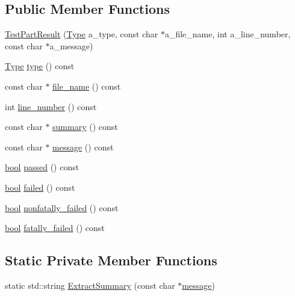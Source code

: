 \subsection*{Public Member Functions}
\begin{DoxyCompactItemize}
\item 
\hyperlink{classtesting_1_1TestPartResult_a6409eb519c1cd514aab2426c8f40737f}{Test\+Part\+Result} (\hyperlink{classtesting_1_1TestPartResult_a65ae656b33fdfdfffaf34858778a52d5}{Type} a\+\_\+type, const char $\ast$a\+\_\+file\+\_\+name, int a\+\_\+line\+\_\+number, const char $\ast$a\+\_\+message)
\item 
\hyperlink{classtesting_1_1TestPartResult_a65ae656b33fdfdfffaf34858778a52d5}{Type} \hyperlink{classtesting_1_1TestPartResult_aab92b225e8a472e78bd3889ca6df0d2a}{type} () const
\item 
const char $\ast$ \hyperlink{classtesting_1_1TestPartResult_a0be40512f50a0086c4d3dc43938978aa}{file\+\_\+name} () const
\item 
int \hyperlink{classtesting_1_1TestPartResult_ad4c5da5f13245ac18cf256d0d9f3eda9}{line\+\_\+number} () const
\item 
const char $\ast$ \hyperlink{classtesting_1_1TestPartResult_a655ab538e510434ba557ad66c35aa42c}{summary} () const
\item 
const char $\ast$ \hyperlink{classtesting_1_1TestPartResult_a5019dc9d753aba5949777270de255d49}{message} () const
\item 
\hyperlink{classbool}{bool} \hyperlink{classtesting_1_1TestPartResult_ac90edd5ea9cc4bb986a1eb2b5e1d53de}{passed} () const
\item 
\hyperlink{classbool}{bool} \hyperlink{classtesting_1_1TestPartResult_aa04b377c3e7ed57d39e882df5561ac90}{failed} () const
\item 
\hyperlink{classbool}{bool} \hyperlink{classtesting_1_1TestPartResult_a6197c7f6672acc1cfdf580eb1f2183ac}{nonfatally\+\_\+failed} () const
\item 
\hyperlink{classbool}{bool} \hyperlink{classtesting_1_1TestPartResult_a77db157eff9531c3c00c2420502f9a89}{fatally\+\_\+failed} () const
\end{DoxyCompactItemize}
\subsection*{Static Private Member Functions}
\begin{DoxyCompactItemize}
\item 
static std\+::string \hyperlink{classtesting_1_1TestPartResult_ac4f4c5383ff6178f441f8bf4ce5ebbff}{Extract\+Summary} (const char $\ast$\hyperlink{classtesting_1_1TestPartResult_a5019dc9d753aba5949777270de255d49}{message})
\end{DoxyCompactItemize}
